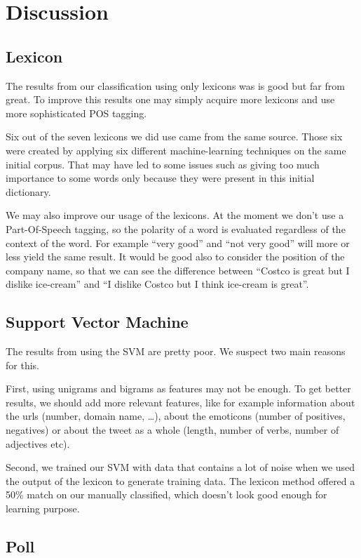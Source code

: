 \documentclass[a4paper,12pt]{report}
\begin{document}
\chapter{Discussion}

\section{Lexicon}

The results from our classification using only lexicons was is good but far from great. To improve this results one may simply acquire more lexicons and use more sophisticated POS tagging.

Six out of the seven lexicons we did use came from the same source. Those six were created by applying six different machine-learning techniques on the same initial corpus. That may have led to some issues such as giving too much importance to some words only because they were present in this initial dictionary.

We may also improve our usage of the lexicons. At the moment we don't use a Part-Of-Speech tagging, so the polarity of a word is evaluated regardless of the context of the word. For example ``very good'' and ``not very good'' will more or less yield the same result. It would be good also to consider the position of the company name, so that we can see the difference between ``Costco is great but I dislike ice-cream'' and ``I dislike Costco but I think ice-cream is great''.

\section{Support Vector Machine}

The results from using the SVM are pretty poor. We suspect two main reasons for this.

First, using unigrams and bigrams as features may not be enough. To get better results, we should add more relevant features, like for example information about the urls (number, domain name, …), about the emoticons (number of positives, negatives) or about the tweet as a whole (length, number of verbs, number of adjectives etc).

Second, we trained our SVM with data that contains a lot of noise when we used the output of the lexicon to generate training data. The lexicon method offered a 50\% match on our manually classified, which doesn’t look good enough for learning purpose.

\section{Poll}
\end{document}
